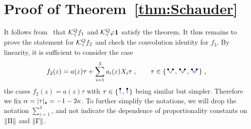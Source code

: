 \documentclass[reqno,11pt]{article}
\def\unit{\vone}
\def\abss#1{\abs{#1}_\mathfrak{s}}
\begin{document}

\section{Proof of Theorem~\ref{thm:Schauder}}
\label{app:Schauder} 

It follows from~\cite[Prop.~6.16 and Thm.~7.1]{Hairer2014} that ${\mathcal K}^Q_\gamma
f_1$ and $\cK^Q_\gamma \varphi\unit$ satisfy the theorem. It thus remains to
prove the statement for ${\mathcal K}^Q_\gamma f_2$ and check the convolution identity
for $f_3$. By linearity, it is sufficient to consider the case 
\begin{equation}
\label{eq:def_f2} 
 f_2(z) = a(z)\tau + \sum_{i=1}^3 a_i(z) X_i\tau\;, 
 \qquad 
 \tau\in\set{\RSV,\RSVo,\RSVoo}\;,
\end{equation} 
the cases $f_2(z)=a(z)\tau$ with $\tau\in\set{\RSI,\RSoI}$ being similar but 
simpler. Therefore we fix $\alpha=\abss{\tau} =-1-2\kappa$. To further simplify 
the notations, we will drop the notation $\sum_{i=1}^3$, and not indicate the 
dependence of proportionality constants on $\lVert\Pi\rVert$ and $\lVert\Gamma\rVert$.
\end{document}

